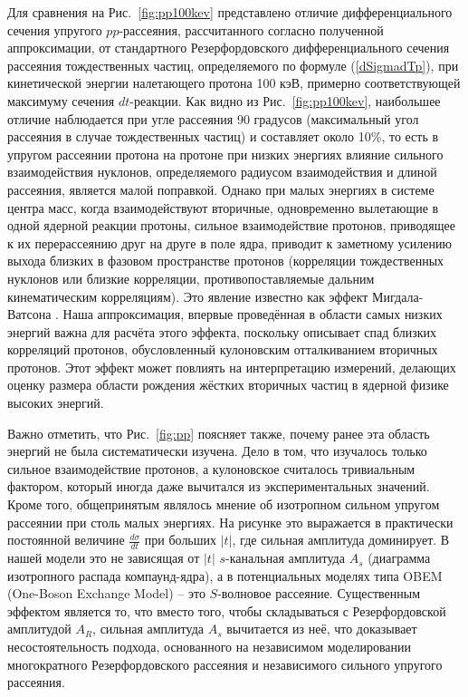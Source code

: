 \documentclass[a4paper,12pt]{article}
\begin{document}
\begin{large}
 Для сравнения на Рис.~\ref{fig:pp100kev} представлено отличие дифференциального сечения упругого $pp$-рассеяния, рассчитанного согласно полученной аппроксимации, от стандартного Резерфордовского дифференциального сечения рассеяния тождественных частиц, определяемого по формуле (\ref{dSigmadTp}), при кинетической энергии налетающего протона 100 кэВ, примерно соответствующей максимуму сечения $dt$-реакции.
  Как видно из Рис.~\ref{fig:pp100kev}, наибольшее отличие наблюдается при угле рассеяния 90 градусов (максимальный угол рассеяния в случае тождественных частиц) и составляет около 10\%, то есть в упругом рассеянии протона на протоне при низких энергиях влияние сильного взаимодействия нуклонов, определяемого радиусом взаимодействия и длиной рассеяния, является малой поправкой.
  Однако при малых энергиях в системе центра масс, когда взаимодействуют вторичные, одновременно вылетающие в одной ядерной реакции протоны, сильное взаимодействие протонов, приводящее к их перерассеянию друг на друге в поле ядра, приводит к заметному усилению выхода близких в фазовом пространстве протонов (корреляции тождественных нуклонов или близкие корреляции, противопоставляемые дальним кинематическим корреляциям).
  Это явление известно как эффект Мигдала-Ватсона \cite{MigdalPP,WatsonPP}.
  Наша аппроксимация, впервые проведённая в области самых низких энергий важна для расчёта этого эффекта, поскольку описывает спад близких корреляций протонов, обусловленный кулоновским отталкиванием вторичных протонов.
  Этот эффект может повлиять на интерпретацию измерений, делающих оценку размера области рождения жёстких вторичных частиц в ядерной физике высоких энергий.
  
  Важно отметить, что Рис.~\ref{fig:pp} поясняет также, почему ранее эта область энергий не была систематически изучена.
  Дело в том, что изучалось только сильное взаимодействие протонов, а кулоновское считалось тривиальным фактором, который иногда даже вычитался из экспериментальных значений.
  Кроме того, общепринятым являлось мнение об изотропном сильном упругом рассеянии при столь малых энергиях.
  На рисунке это выражается в практически постоянной величине $\frac{d\sigma}{dt}$ при больших $|t|$, где сильная амплитуда доминирует.
  В нашей модели это не зависящая от $|t|$ $s$-канальная амплитуда $A_s$ (диаграмма изотропного распада компаунд-ядра), а в потенциальных моделях типа OBEM (One-Boson Exchange Model) -- это $S$-волновое рассеяние.
  Существенным эффектом является то, что вместо того, чтобы складываться с Резерфордовской амплитудой  $A_R$, сильная амплитуда $A_s$ вычитается из неё, что доказывает несостоятельность подхода, основанного на независимом моделировании многократного Резерфордовского рассеяния и независимого сильного упругого рассеяния.
  


\end{large}
\end{document}
